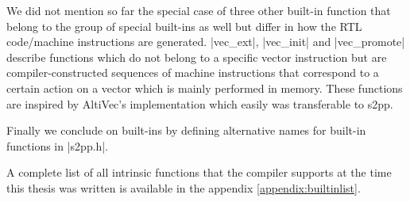 We did not mention so far the special case of three other built-in function that belong to the group of special built-ins as well but differ in how the RTL code/machine instructions are generated.
|vec_ext|, |vec_init| and |vec_promote| describe functions which do not belong to a specific vector instruction but are compiler-constructed sequences of machine instructions that correspond to a certain action on a vector which is mainly performed in memory.
These functions are inspired by AltiVec's implementation which easily was transferable to s2pp.

Finally we conclude on built-ins by defining alternative names for built-in functions in |s2pp.h|.

A complete list of all intrinsic functions that the compiler supports at the time this thesis was written is available in the appendix \ref{appendix:builtinlist}.

